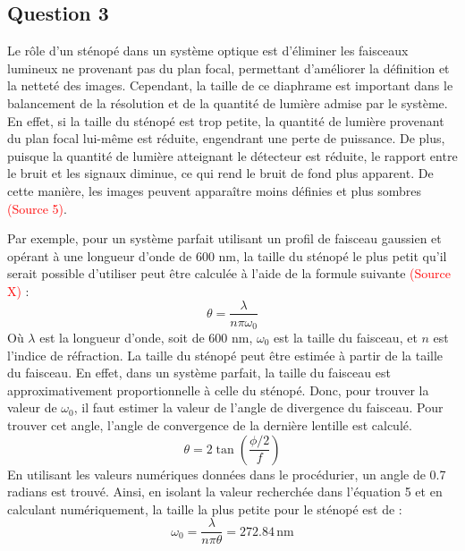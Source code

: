 \documentclass[11pt,letterpaper]{article}
\begin{document}

\subsection{Question 3}
Le rôle d'un sténopé dans un système optique est d'éliminer les faisceaux lumineux ne provenant pas du plan focal, permettant d'améliorer la définition et la netteté des images. Cependant, la taille de ce diaphrame est important dans le balancement de la résolution et de la quantité de lumière admise par le système. En effet, si la taille du sténopé est trop petite, la quantité de lumière provenant du plan focal lui-même est réduite, engendrant une perte de puissance. De plus, puisque la quantité de lumière atteignant le détecteur est réduite, le rapport entre le bruit et les signaux diminue, ce qui rend le bruit de fond plus apparent. De cette manière, les images peuvent apparaître moins définies et plus sombres \textcolor{red}{(Source 5)}. 

Par exemple, pour un système parfait utilisant un profil de faisceau gaussien et opérant à une longueur d'onde de 600 nm, la taille du sténopé le plus petit qu'il serait possible d'utiliser peut être calculée à l'aide de la formule suivante \textcolor{red}{(Source X)} :
\begin{equation}
  \theta=\frac{\lambda}{n\pi\omega_{0}}
\end{equation}
Où $\lambda$ est la longueur d'onde, soit de 600 nm, $\omega_{0}$ est la taille du faisceau, et $n$ est l'indice de réfraction. La taille du sténopé peut être estimée à partir de la taille du faisceau. En effet, dans un système parfait, la taille du faisceau est approximativement proportionnelle à celle du sténopé. Donc, pour trouver la valeur de $\omega_0$, il faut estimer la valeur de l'angle de divergence du faisceau. Pour trouver cet angle, l'angle de convergence de la dernière lentille est calculé.
\begin{equation}
  \theta=2\tan\left(\frac{\phi/2}{f}\right)
\end{equation}
En utilisant les valeurs numériques données dans le procédurier, un angle de 0.7 radians est trouvé. Ainsi, en isolant la valeur recherchée dans l'équation 5 et en calculant numériquement, la taille la plus petite pour le sténopé est de :
\begin{equation}
  \omega_{0}=\frac{\lambda}{n\pi\theta}=272.84\,\mathrm{nm}
\end{equation}
\end{document}
